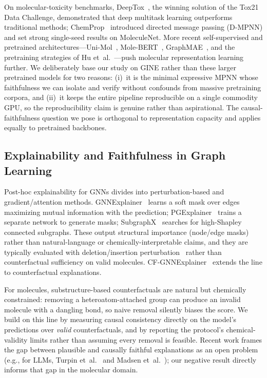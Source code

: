 \documentclass[conference]{IEEEtran}
\begin{document}
On molecular-toxicity benchmarks, DeepTox~\cite{mayr2016deeptox}, the winning solution of the Tox21 Data Challenge, demonstrated that deep multitask learning outperforms traditional methods; ChemProp~\cite{yang2019analyzing} introduced directed message passing (D-MPNN) and set strong single-seed results on MoleculeNet. More recent self-supervised and pretrained architectures---Uni-Mol~\cite{zhou2022unimol}, Mole-BERT~\cite{xia2023molebert}, GraphMAE~\cite{zhang2022graphmae}, and the pretraining strategies of Hu et~al.~\cite{hu2020strategies}---push molecular representation learning further. We deliberately base our study on GINE rather than these larger pretrained models for two reasons: (i)~it is the minimal expressive MPNN whose faithfulness we can isolate and verify without confounds from massive pretraining corpora, and (ii)~it keeps the entire pipeline reproducible on a single commodity GPU, so the reproducibility claim is genuine rather than aspirational. The causal-faithfulness question we pose is orthogonal to representation capacity and applies equally to pretrained backbones.

\subsection{Explainability and Faithfulness in Graph Learning}
Post-hoc explainability for GNNs divides into perturbation-based and gradient/attention methods. GNNExplainer~\cite{ying2019gnnexplainer} learns a soft mask over edges maximizing mutual information with the prediction; PGExplainer~\cite{luo2020parameterized} trains a separate network to generate masks; SubgraphX~\cite{yuan2021explainability} searches for high-Shapley connected subgraphs. These output structural importance (node/edge masks) rather than natural-language or chemically-interpretable claims, and they are typically evaluated with deletion/insertion perturbation~\cite{deyoung2020eraser} rather than counterfactual sufficiency on valid molecules. CF-GNNExplainer~\cite{lucic2022cfgnnexplainer} extends the line to counterfactual explanations.

For molecules, substructure-based counterfactuals are natural but chemically constrained: removing a heteroatom-attached group can produce an invalid molecule with a dangling bond, so naive removal silently biases the score. We build on this line by measuring causal consistency directly on the model's predictions over \emph{valid} counterfactuals, and by reporting the protocol's chemical-validity limits rather than assuming every removal is feasible. Recent work frames the gap between plausible and causally faithful explanations as an open problem (e.g., for LLMs, Turpin et~al.~\cite{turpin2023language} and Madsen et~al.~\cite{madsen2024selfexplanations}); our negative result directly informs that gap in the molecular domain.
\end{document}
